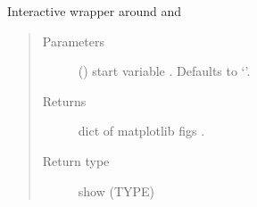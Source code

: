 \documentclass[letterpaper,10pt,english]{sphinxmanual}
\begin{document}
\begin{fulllineitems}
\begin{fulllineitems}
\label{\detokenize{core/modelclass:modelclass.Dekomp_Mixin.get_dekom_gui}}
\pysigstartsignatures
{}
\pysigstopsignatures
\sphinxAtStartPar
Interactive wrapper around {\hyperref[\detokenize{core/modelclass:modelclass.Dekomp_Mixin.dekomp_plot}]{}} and {\hyperref[\detokenize{core/modelclass:modelclass.Dekomp_Mixin.dekomp_plot_per}]{}}
\begin{quote}\begin{description}
\item[{Parameters}] \leavevmode
\sphinxAtStartPar
{} (\sphinxstyleliteralemphasis{\sphinxupquote{, }}) \textendash{} start variable . Defaults to ‘’.

\item[{Returns}] \leavevmode
\sphinxAtStartPar
dict of matplotlib figs .

\item[{Return type}] \leavevmode
\sphinxAtStartPar
show (TYPE)

\end{description}\end{quote}

\end{fulllineitems}



\end{fulllineitems}
\end{document}

